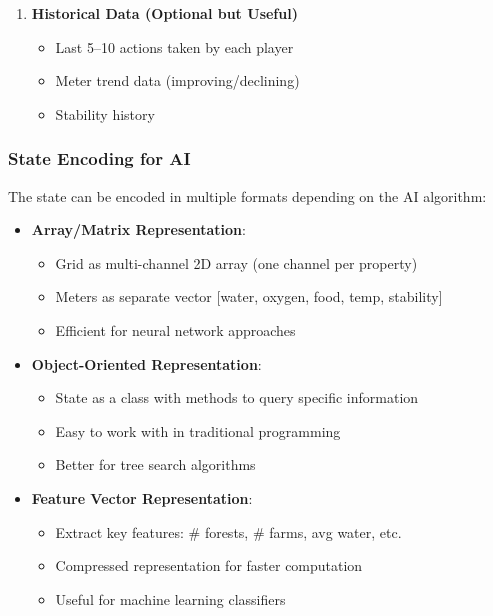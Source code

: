 \documentclass[12pt,a4paper]{article}
\begin{document}
\begin{enumerate}
    \item \textbf{Historical Data (Optional but Useful)}
    \begin{itemize}
        \item Last 5--10 actions taken by each player
        \item Meter trend data (improving/declining)
        \item Stability history
    \end{itemize}
\end{enumerate}

\subsubsection{State Encoding for AI}

The state can be encoded in multiple formats depending on the AI algorithm:

\begin{itemize}
    \item \textbf{Array/Matrix Representation}:
    \begin{itemize}
        \item Grid as multi-channel 2D array (one channel per property)
        \item Meters as separate vector [water, oxygen, food, temp, stability]
        \item Efficient for neural network approaches
    \end{itemize}
    
    \item \textbf{Object-Oriented Representation}:
    \begin{itemize}
        \item State as a class with methods to query specific information
        \item Easy to work with in traditional programming
        \item Better for tree search algorithms
    \end{itemize}
    
    \item \textbf{Feature Vector Representation}:
    \begin{itemize}
        \item Extract key features: \# forests, \# farms, avg water, etc.
        \item Compressed representation for faster computation
        \item Useful for machine learning classifiers
    \end{itemize}
\end{itemize}
\end{document}
